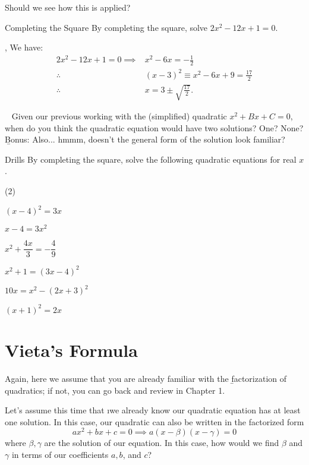 \documentclass[../../main.tex]{subfiles}
\begin{document}
Should we see how this is applied?

\newpage\begin{example}{Completing the Square}
By completing the square, solve $2x^2-12x+1=0$.

\sep
We have:
\begin{align}
    2x^2-12x+1=0\implies& x^2-6x=-\frac12 \\
    \therefore\ & (x-3)^2\equiv x^2-6x+9=\frac{17}2 \\
    \therefore\ & x=3\pm\sqrt{\frac{17}{2}}.
\end{align}

\end{example}

\begin{thinking}{~}
Given our previous working with the (simplified) quadratic $x^2+Bx+C=0$, when do you think the quadratic equation would have two solutions? One? None? \b{Bonus:} Also... hmmm, doesn't the general form of the solution look familiar?
\end{thinking}
\begin{questions}{Drills}
By completing the square, solve the following quadratic equations for real $x$.
\begin{question_set}(2)
    \item $(x-4)^2=3x$
    \item $x-4=3x^2$
    \item $x^2+\dfrac{4x}{3}=-\dfrac{4}{9}$
    \item $x^2+1=(3x-4)^2$
    \item $10x=x^2-(2x+3)^2$
    \item $(x+1)^2=2x$
\end{question_set}
\end{questions}


\section{Vieta's Formula}
Again, here we assume that you are already familiar with the \b{factorization} of quadratics; if not, you can go back and review in Chapter 1.

Let's assume this time that \i{we already know our quadratic equation has at least one solution}. In this case, our quadratic can also be written in the factorized form
\begin{equation*}
    ax^2+bx+c=0\implies a(x - \beta)(x - \gamma) = 0
\end{equation*}
where $\beta,\gamma$ are the solution of our equation. In this case, how would we find $\beta$ and $\gamma$ in terms of our coefficients $a, b$, and $c$?
\end{document}
